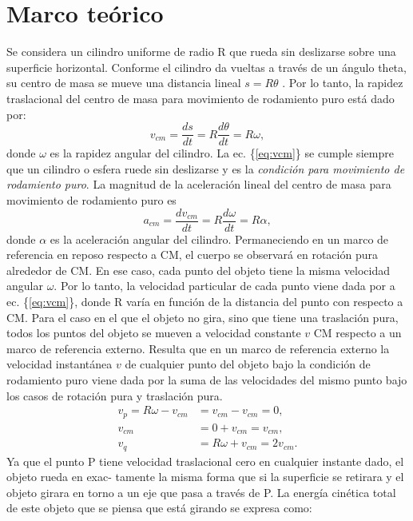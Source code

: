 \section{Marco teórico}
Se considera un cilindro uniforme de radio R que rueda sin deslizarse sobre una superficie horizontal.
Conforme el cilindro da vueltas a través de un ángulo theta, su centro de masa se mueve una distancia
lineal $s=R\theta$ . Por lo tanto, la rapidez traslacional del centro de masa para movimiento de rodamiento
puro está dado por:
\begin{equation}
    v_{cm}=\frac{ds}{dt}=R\frac{d\theta}{dt}=R\omega,
    \label{eq:vcm}
\end{equation}
donde $\omega$ es la rapidez angular del cilindro. La ec. \{\ref{eq:vcm}\} se cumple siempre que un cilindro o esfera ruede
sin deslizarse y es la \textit{condición para movimiento de rodamiento puro}. La magnitud de la aceleración
lineal del centro de masa para movimiento de rodamiento puro es
\begin{equation}
    a_{cm}=\frac{dv_{cm}}{dt}=R\frac{d\omega}{dt} = R\alpha,
    \label{eq:acm}
\end{equation}
donde $\alpha$ es la aceleración angular del cilindro. Permaneciendo en un marco de referencia en reposo respecto a CM, el cuerpo se observará en rotación pura alrededor de CM. En ese caso, cada punto del objeto
tiene la misma velocidad angular $\omega$. Por lo tanto, la velocidad particular de cada punto viene dada por a
ec. \{\ref{eq:vcm}\}, donde R varía en función de la distancia del punto con respecto a CM. Para el caso en el que el
objeto no gira, sino que tiene una traslación pura, todos los puntos del objeto se mueven a velocidad
constante $v$ CM respecto a un marco de referencia externo. Resulta que en un marco de referencia externo
la velocidad instantánea $v$ de cualquier punto del objeto bajo la condición de rodamiento puro viene dada
por la suma de las velocidades del mismo punto bajo los casos de rotación pura y traslación pura.
\begin{align*}
    v_p=R\omega -v_{cm} &=v_{cm}-v_{cm}=0,\\
    v_{cm} &=0+v_{cm}=v_{cm},\\
    v_{q}&= R\omega +v_{cm}=2v_{cm}.
\end{align*}
Ya que el punto P tiene velocidad traslacional cero en cualquier instante dado, el objeto rueda en exac-
tamente la misma forma que si la superficie se retirara y el objeto girara en torno a un eje que pasa a
través de P. La energía cinética total de este objeto que se piensa que está girando se expresa como:

